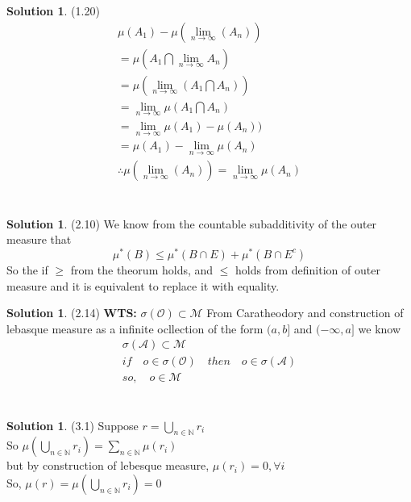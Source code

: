 \documentclass[letterpaper,12pt]{article}
\theoremstyle{definition}
\newtheorem{solution}[theorem]{Solution}
\begin{document}
\newpage
\begin{solution} (1.20) \\
\begin{gather*}
\mu(A_1) - \mu(\lim_{n \rightarrow \infty} (A_n))\\
= \mu(A_1 \bigcap \lim_{n \rightarrow \infty} A_n) \\
= \mu(\lim_{n \rightarrow \infty} (A_1 \bigcap A_n) ) \\
= \lim_{n \rightarrow \infty} \mu(A_1 \bigcap A_n) \\
= \lim_{n \rightarrow \infty} \mu(A_1) - \mu (A_n)) \\
= \mu(A_1) - \lim_{n \rightarrow \infty} \mu(A_n) \\
\therefore \mu(\lim_{n \rightarrow \infty} (A_n)) = \lim_{n \rightarrow \infty} \mu(A_n)
\end{gather*}
\end{solution}

\section{}
\begin{solution}{(2.10)}
We know from the countable subadditivity of the outer measure that
$$\mu^*(B) \leq \mu^*(B \cap E) + \mu^*(B \cap E^c) $$
So the if $\geq$ from the theorum holds, and $\leq$ holds from definition of outer measure and it is equivalent to replace it with equality.
\end{solution}

\begin{solution}{(2.14)} \textbf{WTS:} $\sigma(\mathcal{O}) \subset \mathcal{M}$
From Caratheodory and construction of lebasque measure as a infinite ocllection of the form $(a,b]$ and $(-\infty, a]$ we know
\begin{align}
\sigma(\mathcal{A})  \subset \mathcal{M} \\
if \quad o \in \sigma(\mathcal{O}) \quad then \quad o \in \sigma(\mathcal{A}) \\
so, \quad o \in \mathcal{M}
\end{align}

\end{solution}

\section{}
\begin{solution}{(3.1)}
Suppose $r = \bigcup_{n \in \mathbb{N}} r_i$ \\
So $\mu(\bigcup_{n \in \mathbb{N}}r_i) = \sum_{n \in \mathbb{N}}\mu(r_i)$ \\
but by construction of lebesque measure, $\mu(r_i) = 0, \forall i$\\
So, $\mu(r) = \mu(\bigcup_{n \in \mathbb{N}} r_i) = 0$
\end{solution}
\end{document}
